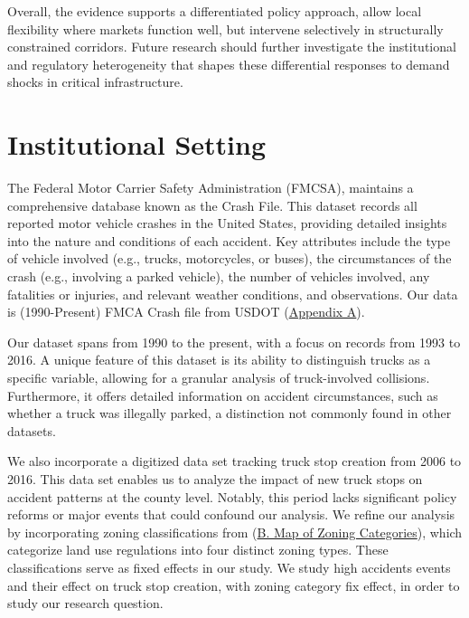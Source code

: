 \documentclass[
  12pt]{article}
\begin{document}
Overall, the evidence supports a differentiated policy approach, allow
local flexibility where markets function well, but intervene selectively
in structurally constrained corridors. Future research should further
investigate the institutional and regulatory heterogeneity that shapes
these differential responses to demand shocks in critical
infrastructure.

\section{Institutional Setting}\label{institutional-setting}

The Federal Motor Carrier Safety Administration (FMCSA), maintains a
comprehensive database known as the Crash File. This dataset records all
reported motor vehicle crashes in the United States, providing detailed
insights into the nature and conditions of each accident. Key attributes
include the type of vehicle involved (e.g., trucks, motorcycles, or
buses), the circumstances of the crash (e.g., involving a parked
vehicle), the number of vehicles involved, any fatalities or injuries,
and relevant weather conditions, and observations. Our data is
(1990-Present) FMCA Crash file from USDOT
(\label{sec:appendix-a}\hyperref[sec-a.-visualization-of-dataset.-]{Appendix
A}).

Our dataset spans from 1990 to the present, with a focus on records from
1993 to 2016. A unique feature of this dataset is its ability to
distinguish trucks as a specific variable, allowing for a granular
analysis of truck-involved collisions. Furthermore, it offers detailed
information on accident circumstances, such as whether a truck was
illegally parked, a distinction not commonly found in other datasets.

We also incorporate a digitized data set tracking truck stop creation
from 2006 to 2016. This data set enables us to analyze the impact of new
truck stops on accident patterns at the county level. Notably, this
period lacks significant policy reforms or major events that could
confound our analysis. We refine our analysis by incorporating zoning
classifications from \citet{puentesTraditionalReformedReview2006}
(\hyperref[sec-b.-map-of-zoning-categories]{B. Map of Zoning
Categories}), which categorize land use regulations into four distinct
zoning types. These classifications serve as fixed effects in our study.
We study high accidents events and their effect on truck stop creation,
with zoning category fix effect, in order to study our research
question.
\end{document}
